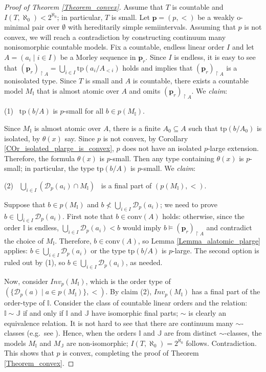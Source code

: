 \documentclass{amsart}
\theoremstyle{definition}
\theoremstyle{definition}
\def\strok{\restriction}
\newcommand{\Mon}{\mathfrak C}
\newcommand{\tp}{\mathrm{tp}}
\newcommand{\conv}{\mathrm{conv}}
\begin{document}
\begin{proof}[Proof of Theorem \ref{Theorem_convex}] Assume that $T$ is countable and $I(T,\aleph_0)<2^{\aleph_0}$; in particular, $T$ is small. Let $\mathbf p=(p,<)$ be a weakly o-minimal pair over $\emptyset$ with hereditarily simple semiintervals.  Assuming that $p$ is not convex, we will reach a contradiction by constructing continuum many nonisomorphic countable models. 
Fix a countable, endless linear order $I$ and let $A=(a_i\mid i\in I)$ be a Morley sequence in $\mathbf p_r$. Since $I$ is endless, it is easy to see that $(\mathbf p_r)_{\strok A}=\bigcup_{i\in I}\tp(a_i/A_{<i})$ holds and implies that $(\mathbf p_r)_{\strok A}$ is a nonisolated type. Since $T$ is small and $A$ is countable, there exists a countable model $M_{\mathbb I}$ that is almost atomic over $A$ and omits $(\mathbf p_r)_{\strok A}$. We {\em claim}:

(1) \ $\tp(b/A)$ is $p$-small for all $b\in p(M_{\mathbb I})$.

Since $M_{\mathbb I}$ is almost atomic over $A$, there is a finite $A_0\subseteq A$ such that $\tp(b/A_0)$ is isolated, by $\theta(x)$ say. 
Since $p$ is not convex, by Corollary  \ref{COr_isolated_plarge_is_convex}, $p$ does not have an isolated $p$-large extension. Therefore, 
the formula $\theta(x)$ is $p$-small. Then any type containing $\theta(x)$ is $p$-small; in particular, the type $\tp(b/A)$ is $p$-small. We {\em claim}:

(2)  \   $\bigcup_{i\in I}(\mathcal D_p(a_i)\cap M_{\mathbb I})$ \ is a final part of  $(p(M_{\mathbb I}),<)$. 

Suppose   that  $b\in p(M_{\mathbb I})$ and  $b\nless \bigcup_{i\in I}\mathcal D_p(a_i)$; we need to prove $b\in \bigcup_{i\in I}\mathcal D_p(a_i)$.  First note that $b\in \conv(A)$ holds: otherwise, since the order $\mathbb I$ is endless, $\bigcup_{i\in I}\mathcal D_p(a_i)<b$  would imply   $b\models(\mathbf p_r)_{\strok A}$  and contradict the choice of $M_{\mathbb I}$. Therefore, $b\in\conv(A)$, so Lemma \ref{Lemma_alatomic_plarge} applies: $b\in \bigcup_{i\in I}\mathcal D_p(a_i)$ or the type $\tp(b/A)$ is $p$-large. The second option is ruled out by (1), so $b\in \bigcup_{i\in I}\mathcal D_p(a_i)$, as needed.

\smallskip
Now, consider $Inv_p(M_{\mathbb I})$, which is the order type of $(\{\mathcal D_p(a)\mid a\in p(M_{\mathbb I})\},<)$. By claim (2), $Inv_p(M_{\mathbb I})$ has a final part of the order-type of $\mathbb I$. 
Consider the class of countable linear orders and the relation: $\mathbb I\sim\mathbb J$ if and only if $\mathbb I$ and $\mathbb J$ have isomorphic final parts; $\sim$ is clearly an equivalence relation. It is not hard to see that there are continuum many $\sim$-classes (e.g.\ see \cite[Section 4.3]{Rast}).  Hence, when the orders $\mathbb I$ and $\mathbb J$ are from distinct $\sim$-classes,  the models $M_{\mathbb I}$ and $M_{\mathbb J}$ are non-isomorphic;  
 $I(T,\aleph_0)=2^{\aleph_0}$ follows. Contradiction. This shows that $p$ is convex, completing the proof of Theorem \ref{Theorem_convex}. 
\end{proof}
\end{document}
